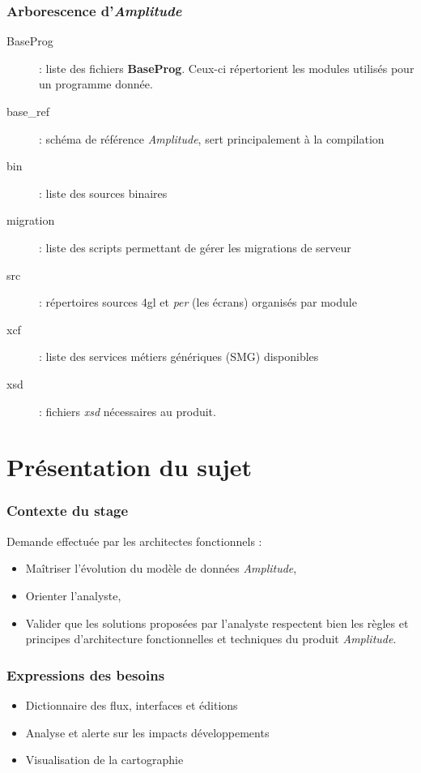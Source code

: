 \documentclass{beamer}
\begin{document}
\begin{frame}
\frametitle{Arborescence d'\textit{Amplitude}}

\begin{description}
	\item[BaseProg] : liste des fichiers \textbf{BaseProg}. Ceux-ci répertorient les modules utilisés pour un programme donnée.
	\item[base\_ref] : schéma de référence \textit{Amplitude}, sert principalement à la compilation
	\item[bin] : liste des sources binaires
	\item[migration] : liste des scripts permettant de gérer les migrations de serveur
	\item[src] : répertoires sources 4gl et \textit{per} (les écrans) organisés par module
	\item[xcf] : liste des services métiers génériques (SMG) disponibles
	\item[xsd] : fichiers \textit{xsd} nécessaires au produit.
\end{description}

\end{frame}

\section{Présentation du sujet}

\begin{frame}
\frametitle{Contexte du stage}

Demande effectuée par les architectes fonctionnels :

\begin{itemize}
	\item Maîtriser l’évolution du modèle de données \textit{Amplitude},
	\item Orienter l’analyste,
	\item Valider que les solutions proposées par l’analyste respectent bien les règles et principes d’architecture fonctionnelles et techniques du produit \textit{Amplitude}.
\end{itemize}

\end{frame}

\begin{frame}
\frametitle{Expressions des besoins}

\begin{itemize}
	\item Dictionnaire des flux, interfaces et éditions
	\item Analyse et alerte sur les impacts développements
	\item Visualisation de la cartographie
\end{itemize}

\end{frame}
\end{document}
